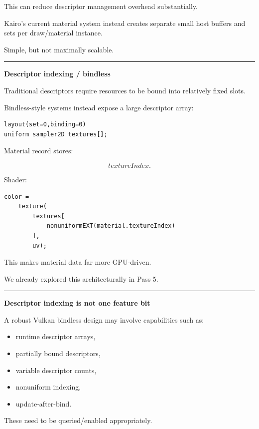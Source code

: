 This can reduce descriptor management overhead substantially.

Kairo's current material system instead creates separate small host buffers and sets per draw/material instance.

Simple, but not maximally scalable.

\begin{center}\rule{0.5\linewidth}{0.5pt}\end{center}

\textbf{Descriptor indexing / bindless}

Traditional descriptors require resources to be bound into relatively fixed slots.

Bindless-style systems instead expose a large descriptor array:

\begin{verbatim}
layout(set=0,binding=0)
uniform sampler2D textures[];
\end{verbatim}

Material record stores:

\[
textureIndex.
\]

Shader:

\begin{verbatim}
color =
    texture(
        textures[
            nonuniformEXT(material.textureIndex)
        ],
        uv);
\end{verbatim}

This makes material data far more GPU-driven.

We already explored this architecturally in Pass 5.

\begin{center}\rule{0.5\linewidth}{0.5pt}\end{center}

\textbf{Descriptor indexing is not one feature bit}

A robust Vulkan bindless design may involve capabilities such as:

\begin{itemize}
\tightlist
\item
  runtime descriptor arrays,
\item
  partially bound descriptors,
\item
  variable descriptor counts,
\item
  nonuniform indexing,
\item
  update-after-bind.
\end{itemize}

These need to be queried/enabled appropriately.

